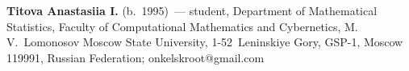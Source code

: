 \vspace*{3pt}

\noindent
\textbf{Titova Anastasiia I.} (b.\ 1995)~--- 
student, Department of Mathematical Statistics, Faculty of Computational Mathematics 
and Cybernetics, M.\,V.~Lomonosov Moscow State University, 1-52~Leninskiye Gory, GSP-1, 
Moscow 119991, Russian Federation; \mbox{onkelskroot@gmail.com}

\label{end\stat}

\renewcommand{\bibname}{\protect\rm Литература}       